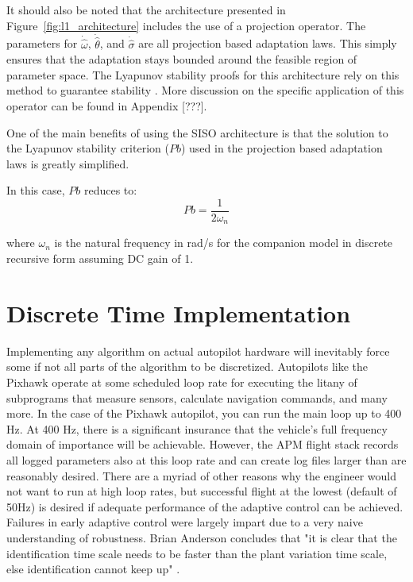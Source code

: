 It should also be noted that the architecture presented in Figure~\ref{fig:l1_architecture} includes the use of a projection operator.  The parameters for $\dot{\hat{\omega}}$, $\dot{\hat{\theta}}$, and $\dot{\hat{\sigma}}$ are all projection based adaptation laws.  This simply ensures that the adaptation stays bounded around the feasible region of parameter space.  The Lyapunov stability proofs for this architecture rely on this method to guarantee stability\cite{hovakimyan2010l1} .  More discussion on the specific application of this operator can be found in Appendix [???].

One of the main benefits of using the \ac{SISO} architecture is that the solution to the Lyapunov stability criterion ($Pb$) used in the projection based adaptation laws is greatly simplified.  

In this case, $Pb$ reduces to:
\begin{equation}
Pb = \frac{1}{2\omega_n}
\end{equation}

where $\omega_n$ is the natural frequency in rad/s for the companion model in discrete recursive form assuming DC gain of 1. 


\section{\Lone Discrete Time Implementation}
Implementing any algorithm on actual autopilot hardware will inevitably force some if not all parts of the algorithm to be discretized.  Autopilots like the Pixhawk operate at some scheduled loop rate for executing the litany of subprograms that measure sensors, calculate navigation commands, and many more.  In the case of the Pixhawk autopilot, you can run the main loop up to 400 Hz.  At 400 Hz, there is a significant insurance that the vehicle's full frequency domain of importance will be achievable.  However, the \ac{APM} flight stack records all logged parameters also at this loop rate and can create log files larger than are reasonably desired.  There are a myriad of other reasons why the engineer would not want to run at high loop rates, but successful flight at the lowest (default of 50Hz) is desired if adequate performance of the adaptive control can be achieved.  Failures in early adaptive control were largely impart due to a very naive understanding of robustness.  Brian Anderson concludes that "it is clear that the identification time scale needs to be faster than the plant variation time scale, else identification cannot keep up" \cite{anderson2005failures}.   

